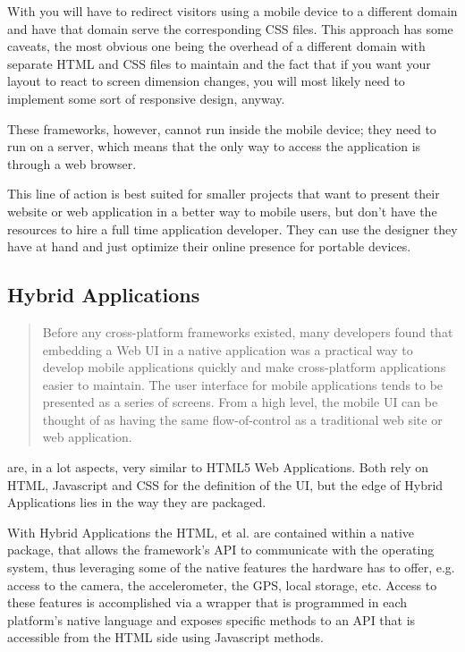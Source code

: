 With  you will have to redirect visitors using a mobile device to a different domain and have that domain serve the corresponding CSS files. This approach has some caveats, the most obvious one being the overhead of a different domain with separate HTML and CSS files to maintain and the fact that if you want your layout to react to screen dimension changes, you will most likely need to implement some sort of responsive design, anyway.   
 

These frameworks, however, cannot run inside the mobile device; they need to run on a server, which means that the only way to access the application is through a web browser.


This line of action is best suited for smaller projects that want to present their website or web application in a better way to mobile users, but don't have the resources to hire a full time application developer. They can use the designer they have at hand and just optimize their online presence for portable devices.

\subsection{Hybrid Applications}\label{sec:hyb_app}
\begin{quotation}
Before any cross-platform frameworks existed, many developers found that embedding a Web \ac{UI} in a native application was a practical way to develop mobile applications quickly and make cross-platform applications easier to maintain. The user interface for mobile applications tends to be presented as a series of screens. From a high level, the mobile \ac{UI} can be thought of as having the same flow-of-control as a traditional web site or web application. \cite[p. 28]{allen:2010}
\end{quotation}

 are, in a lot aspects, very similar to HTML5 Web Applications. Both rely on HTML, Javascript and CSS for the definition of the \ac{UI}, but the edge of Hybrid Applications lies in the way they are packaged.

With Hybrid Applications the HTML, et al. are contained within a native package, that allows the framework's \ac{API} to communicate with the operating system, thus leveraging some of the native features the hardware has to offer, e.g. access to the camera, the accelerometer, the GPS, local storage, etc. Access to these features is accomplished via a wrapper that is programmed in each platform's native language and exposes specific methods to an \ac{API} that is accessible from the HTML side using Javascript methods.

